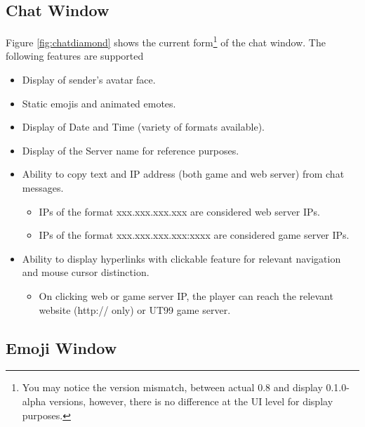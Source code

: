 \documentclass{article}
\theoremstyle{definition}
\begin{document}
\subsection{Chat Window}
\label{sec:chatwindow}
Figure \ref{fig:chatdiamond} shows the current form\footnote{You may notice the version mismatch, between actual 0.8 and display 0.1.0-alpha versions, however, there is no difference at the UI level for display purposes.} of the chat window. The following features are supported
\begin{itemize}
\item Display of sender's avatar face.
\item Static emojis and animated emotes.
\item Display of Date and Time (variety of formats available).
\item Display of the Server name for reference purposes.
\item Ability to copy text and IP address (both game and web server) from chat messages.
\begin{itemize}
\item IPs of the format xxx.xxx.xxx.xxx are considered web server IPs.
\item IPs of the format xxx.xxx.xxx.xxx:xxxx are considered game server IPs.
\end{itemize}
\item Ability to display hyperlinks with clickable feature for relevant navigation and mouse cursor distinction.
\begin{itemize}
\item On clicking web or game server IP, the player can reach the relevant website (http:// only) or UT99 game server.
\end{itemize}
\end{itemize}

\subsection{Emoji Window}
\end{document}
